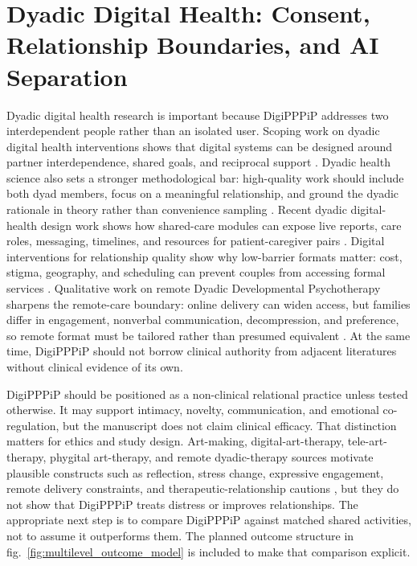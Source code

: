 \documentclass[
  english,
]{article}
\begin{document}
\newpage

\section{Dyadic Digital Health: Consent, Relationship Boundaries, and AI
Separation}\label{sec:health}

Dyadic digital health research is important because DigiPPPiP addresses
two interdependent people rather than an isolated user. Scoping work on
dyadic digital health interventions shows that digital systems can be
designed around partner interdependence, shared goals, and reciprocal
support \citep{shaffer2022dyadic}. Dyadic health science also sets a
stronger methodological bar: high-quality work should include both dyad
members, focus on a meaningful relationship, and ground the dyadic
rationale in theory rather than convenience sampling
\citep{wilson2024dyadichealth}. Recent dyadic digital-health design work
shows how shared-care modules can expose live reports, care roles,
messaging, timelines, and resources for patient-caregiver pairs
\citep{benmessaoud2023dyadicmodule}. Digital interventions for
relationship quality show why low-barrier formats matter: cost, stigma,
geography, and scheduling can prevent couples from accessing formal
services \citep{kernova2025relationship}. Qualitative work on remote
Dyadic Developmental Psychotherapy sharpens the remote-care boundary:
online delivery can widen access, but families differ in engagement,
nonverbal communication, decompression, and preference, so remote format
must be tailored rather than presumed equivalent
\citep{blair2024remoteddp}. At the same time, DigiPPPiP should not
borrow clinical authority from adjacent literatures without clinical
evidence of its own.

DigiPPPiP should be positioned as a non-clinical relational practice
unless tested otherwise. It may support intimacy, novelty,
communication, and emotional co-regulation, but the manuscript does not
claim clinical efficacy. That distinction matters for ethics and study
design. Art-making, digital-art-therapy, tele-art-therapy, phygital
art-therapy, and remote dyadic-therapy sources motivate plausible
constructs such as reflection, stress change, expressive engagement,
remote delivery constraints, and therapeutic-relationship cautions
\citep{kaimal2016cortisol, zubala2021digitalarttherapy, potash2020pandemics, miller2020onlinearttherapy, datlen2020whatsapp, haywood2022hexagonal, yoon2025phygital, blair2024remoteddp},
but they do not show that DigiPPPiP treats distress or improves
relationships. The appropriate next step is to compare DigiPPPiP against
matched shared activities, not to assume it outperforms them. The
planned outcome structure in fig.~\ref{fig:multilevel_outcome_model} is
included to make that comparison explicit.
\end{document}
